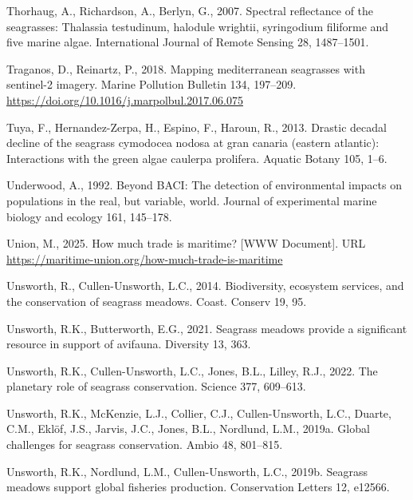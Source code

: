 \documentclass[
  letterpaper,
  11pt,
  english,
  singlespacing,
  headsepline]{MastersDoctoralThesis}
\newlength{\cslhangindent}
\newenvironment{CSLReferences}[2] %
 {\begin{list}{}{%
  \setlength{\itemindent}{0pt}
  \setlength{\leftmargin}{0pt}
  \setlength{\parsep}{0pt}
  \ifodd #1
   \setlength{\leftmargin}{\cslhangindent}
   \setlength{\itemindent}{-1\cslhangindent}
  \fi
  \setlength{\itemsep}{#2\baselineskip}}}
 {\end{list}}
\begin{document}
\begin{CSLReferences}{1}{0}
Thorhaug, A., Richardson, A., Berlyn, G., 2007. Spectral reflectance of
the seagrasses: Thalassia testudinum, halodule wrightii, syringodium
filiforme and five marine algae. International Journal of Remote Sensing
28, 1487--1501.

Traganos, D., Reinartz, P., 2018. Mapping mediterranean seagrasses with
sentinel-2 imagery. Marine Pollution Bulletin 134, 197--209.
\url{https://doi.org/10.1016/j.marpolbul.2017.06.075}

Tuya, F., Hernandez-Zerpa, H., Espino, F., Haroun, R., 2013. Drastic
decadal decline of the seagrass cymodocea nodosa at gran canaria
(eastern atlantic): Interactions with the green algae caulerpa
prolifera. Aquatic Botany 105, 1--6.

Underwood, A., 1992. Beyond BACI: The detection of environmental impacts
on populations in the real, but variable, world. Journal of experimental
marine biology and ecology 161, 145--178.

Union, M., 2025. How much trade is maritime? {[}WWW Document{]}. URL
\url{https://maritime-union.org/how-much-trade-is-maritime}

Unsworth, R., Cullen-Unsworth, L.C., 2014. Biodiversity, ecosystem
services, and the conservation of seagrass meadows. Coast. Conserv 19,
95.

Unsworth, R.K., Butterworth, E.G., 2021. Seagrass meadows provide a
significant resource in support of avifauna. Diversity 13, 363.

Unsworth, R.K., Cullen-Unsworth, L.C., Jones, B.L., Lilley, R.J., 2022.
The planetary role of seagrass conservation. Science 377, 609--613.

Unsworth, R.K., McKenzie, L.J., Collier, C.J., Cullen-Unsworth, L.C.,
Duarte, C.M., Eklöf, J.S., Jarvis, J.C., Jones, B.L., Nordlund, L.M.,
2019a. Global challenges for seagrass conservation. Ambio 48, 801--815.

Unsworth, R.K., Nordlund, L.M., Cullen-Unsworth, L.C., 2019b. Seagrass
meadows support global fisheries production. Conservation Letters 12,
e12566.


\end{CSLReferences}
\end{document}

